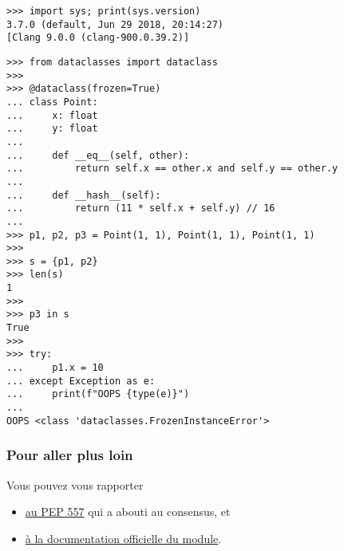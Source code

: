     \begin{verbatim}
>>> import sys; print(sys.version)
3.7.0 (default, Jun 29 2018, 20:14:27)
[Clang 9.0.0 (clang-900.0.39.2)]
\end{verbatim}

    \begin{verbatim}
>>> from dataclasses import dataclass
>>>
>>> @dataclass(frozen=True)
... class Point:
...     x: float
...     y: float
...
...     def __eq__(self, other):
...         return self.x == other.x and self.y == other.y
...
...     def __hash__(self):
...         return (11 * self.x + self.y) // 16
...
>>> p1, p2, p3 = Point(1, 1), Point(1, 1), Point(1, 1)
>>>
>>> s = {p1, p2}
>>> len(s)
1
>>>
>>> p3 in s
True
>>>
>>> try:
...     p1.x = 10
... except Exception as e:
...     print(f"OOPS {type(e)}")
...
OOPS <class 'dataclasses.FrozenInstanceError'>
\end{verbatim}

    \hypertarget{pour-aller-plus-loin}{%
\subsubsection{Pour aller plus loin}\label{pour-aller-plus-loin}}

    Vous pouvez vous rapporter

\begin{itemize}
\tightlist
\item
  \href{https://www.python.org/dev/peps/pep-0557/}{au PEP 557} qui a
  abouti au consensus, et
\item
  \href{https://docs.python.org/3/library/dataclasses.html}{à la
  documentation officielle du module}.
\end{itemize}